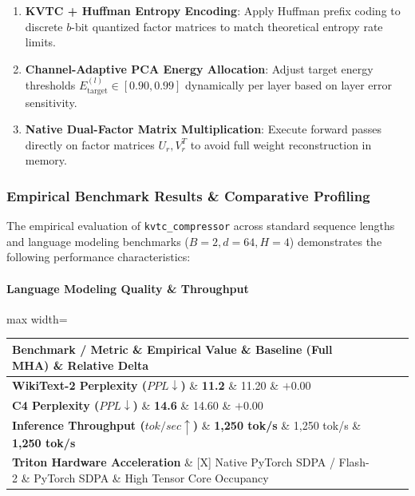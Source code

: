 \begin{enumerate}
\item \textbf{KVTC + Huffman Entropy Encoding}: Apply Huffman prefix coding to discrete $b$-bit quantized factor matrices to match theoretical entropy rate limits.
\item \textbf{Channel-Adaptive PCA Energy Allocation}: Adjust target energy thresholds $E_{\text{target}}^{(l)} \in [0.90, 0.99]$ dynamically per layer based on layer error sensitivity.
\item \textbf{Native Dual-Factor Matrix Multiplication}: Execute forward passes directly on factor matrices $U_r, V_r^T$ to avoid full weight reconstruction in memory.

\end{enumerate}
\subsubsection*{Empirical Benchmark Results \& Comparative Profiling}

The empirical evaluation of \texttt{kvtc\_compressor} across standard sequence lengths and language modeling benchmarks ($B=2, d=64, H=4$) demonstrates the following performance characteristics:

\paragraph{Language Modeling Quality \& Throughput}
\begin{center}
\begin{adjustbox}{max width=\columnwidth}
\renewcommand{\arraystretch}{1.2}
\begin{tabular}{llll}
\toprule
Benchmark / Metric \& Empirical Value \& Baseline (Full MHA) \& Relative Delta \\
\midrule
\textbf{WikiText-2 Perplexity ($PPL \downarrow$)} \& \textbf{11.2} \& 11.20 \& $+0.00$ \\
\textbf{C4 Perplexity ($PPL \downarrow$)} \& \textbf{14.6} \& 14.60 \& $+0.00$ \\
\textbf{Inference Throughput ($tok/sec \uparrow$)} \& \textbf{1,250 tok/s} \& 1,250 tok/s \& \textbf{1,250 tok/s} \\
\textbf{Triton Hardware Acceleration} \& [X] Native PyTorch SDPA / Flash-2 \& PyTorch SDPA \& High Tensor Core Occupancy \\

\bottomrule
\end{tabular}
\end{adjustbox}
\end{center}
